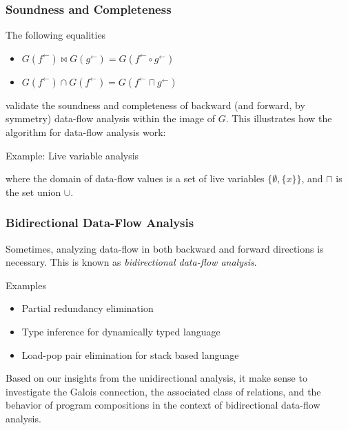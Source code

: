 \documentclass{beamer}
\newcommand{\fb}{{f^{\leftarrow}}}
\newcommand{\gb}{{g^{\leftarrow}}}
\newcommand{\meet}{\sqcap}
\newcommand{\comp}{\circ}
\begin{document}
\begin{frame}
  \frametitle{Soundness and Completeness}
  The following equalities
  \begin{itemize}
    \item $G(\fb) \bowtie G(\gb) = G(\fb \comp \gb)$
    \item $G(\fb) \cap G(\fb) = G(\fb \meet \gb)$
  \end{itemize}
  validate the soundness and completeness of backward (and forward, by symmetry) data-flow analysis within the image of $G$.  This illustrates how the algorithm for data-flow analysis work:
  \begin{block}{Example: Live variable analysis}
   \begin{center}
  \end{center}
  \end{block}
  where the domain of data-flow values is a set of live variables $\{\emptyset, \{ x \}\}$, and $\meet$ is the set union $\cup$.
\end{frame}

\begin{frame}
  \frametitle{Bidirectional Data-Flow Analysis}
  Sometimes, analyzing data-flow in both backward and forward directions is necessary. This is known as \emph{bidirectional data-flow analysis}.
  \begin{block}{Examples}
  \begin{itemize}
    \item Partial redundancy elimination
    \item Type inference for dynamically typed language
    \item Load-pop pair elimination for stack based language
  \end{itemize}
  \end{block}
  Based on our insights from the unidirectional analysis, it make sense to investigate the Galois connection, the associated class of relations, and the behavior of program compositions in the context of bidirectional data-flow analysis.
\end{frame}
\end{document}

